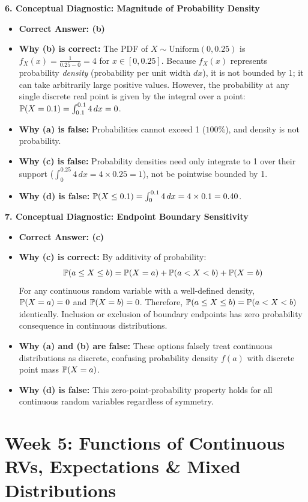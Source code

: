 \textbf{6. Conceptual Diagnostic: Magnitude of Probability Density}
\begin{itemize}
    \item \textbf{Correct Answer: (b)}
    \item \textbf{Why (b) is correct:} The PDF of $X \sim \text{Uniform}(0, 0.25)$ is $f_X(x) = \frac{1}{0.25 - 0} = 4$ for $x \in [0, 0.25]$. Because $f_X(x)$ represents probability \emph{density} (probability per unit width $dx$), it is not bounded by 1; it can take arbitrarily large positive values. However, the probability at any single discrete real point is given by the integral over a point: $\P(X = 0.1) = \int_{0.1}^{0.1} 4 \, dx = 0$.
    \item \textbf{Why (a) is false:} Probabilities cannot exceed 1 ($100\%$), and density is not probability.
    \item \textbf{Why (c) is false:} Probability densities need only integrate to 1 over their support ($\int_0^{0.25} 4 \, dx = 4 \times 0.25 = 1$), not be pointwise bounded by 1.
    \item \textbf{Why (d) is false:} $\P(X \le 0.1) = \int_0^{0.1} 4 \, dx = 4 \times 0.1 = 0.40$.
\end{itemize}

\textbf{7. Conceptual Diagnostic: Endpoint Boundary Sensitivity}
\begin{itemize}
    \item \textbf{Correct Answer: (c)}
    \item \textbf{Why (c) is correct:} By additivity of probability:
    $$\P(a \le X \le b) = \P(X = a) + \P(a < X < b) + \P(X = b)$$
    For any continuous random variable with a well-defined density, $\P(X = a) = 0$ and $\P(X = b) = 0$. Therefore, $\P(a \le X \le b) = \P(a < X < b)$ identically. Inclusion or exclusion of boundary endpoints has zero probability consequence in continuous distributions.
    \item \textbf{Why (a) and (b) are false:} These options falsely treat continuous distributions as discrete, confusing probability density $f(a)$ with discrete point mass $\P(X = a)$.
    \item \textbf{Why (d) is false:} This zero-point-probability property holds for all continuous random variables regardless of symmetry.
\end{itemize}

\section*{Week 5: Functions of Continuous RVs, Expectations \& Mixed Distributions}

